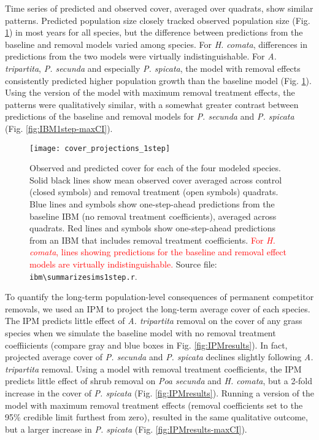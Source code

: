 \documentclass[11pt]{article}
\newcommand{\new}{\textcolor{red}}
\begin{document}
\begin{doublespacing}
Time series of predicted and observed cover, averaged over quadrats, show similar patterns. Predicted population size closely tracked observed population size (Fig. \ref{fig:IBM1step}) in most years for all species, but the difference between predictions from the baseline and removal models varied among species. For \textit{H. comata}, differences in predictions from the two models were virtually indistinguishable. For \textit{A. tripartita}, \textit{P. secunda} and especially \textit{P. spicata}, the model with removal effects consistently predicted higher population growth than the baseline model (Fig. \ref{fig:IBM1step}). Using the version of the model with maximum removal treatment effects, the patterns were qualitatively similar, with a somewhat greater contrast between predictions of the baseline and removal models for \textit{P. secunda} and \textit{P. spicata} (Fig. \ref{fig:IBM1step-maxCI}). 

 \begin{figure}[tbp]
 \centering
 \texttt{[image: cover\_projections\_1step]}
 \caption{Observed and predicted cover for each of the four modeled species. Solid black lines show mean observed cover averaged across control (closed symbols) and removal treatment (open symbols) quadrats. Blue lines and symbols show one-step-ahead predictions from the baseline IBM (no removal treatment coefficients), averaged across quadrats. Red lines and symbols show one-step-ahead predictions from an IBM that includes removal treatment coefficients. \new{For \textit{H. comata}, lines showing predictions for the baseline and removal effect models are virtually indistinguishable.} Source file: \texttt{ibm\textbackslash summarize\textunderscore sims1step.r}. }
 \label{fig:IBM1step}
 \end{figure}
 

To quantify the long-term population-level consequences of permanent competitor removals, we used an IPM to project the long-term average cover of each species. The IPM predicts little effect of \textit{A. tripartita} removal on the cover of any grass species when we simulate the baseline model with no removal treatment coeffiicients (compare gray and blue boxes in Fig. \ref{fig:IPMresults}). In fact, projected average cover of \textit{P. secunda} and \textit{P. spicata} declines slightly following \textit{A. tripartita} removal. Using a model with removal treatment coefficients, the IPM predicts little effect of shrub removal on \textit{Poa secunda} and \textit{H. comata}, but a 2-fold increase in the cover of \textit{P. spicata} (Fig. \ref{fig:IPMresults}). Running a version of the model with maximum removal treatment effects (removal coefficients set to the 95\% credible limit furthest from zero), resulted in the same qualitative outcome, but a larger increase in \textit{P. spicata} (Fig. \ref{fig:IPMresults-maxCI}). 



\end{doublespacing}
\end{document}
